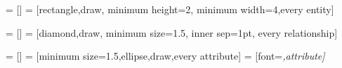 %
%
%


\usetikzlibrary{shapes.geometric}%


=           []%
=                 [rectangle,draw,
                                     minimum height=2\baselineskip,
                                     minimum width=4\baselineskip,every entity]%



=     []%
=           [diamond,draw,
                                     minimum size=1.5\baselineskip,
                                     inner sep=1pt,
                                     every relationship]%



=        []%
=              [minimum size=1.5\baselineskip,ellipse,draw,every attribute]%
=          [font=\itshape,attribute]%




\endinput
